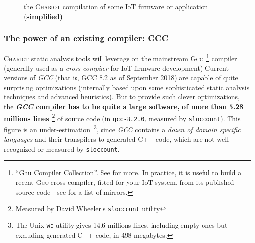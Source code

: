\begin{figure}[h]
  \begin{center}
  \end{center}
  \caption{the \textsc{Chariot} compilation of some IoT firmware or
    application {\textbf{(simplified)}}}
  \label{fig:chariotcompil}
\end{figure}


\subsubsection{The power of an existing compiler: GCC}

\textsc{Chariot} static analysis tools will leverage on the mainstream
\textsc{Gcc}~\footnote{``Gnu Compiler Collection''. See
   for more. In practice, it is useful to
  build a recent \textsc{Gcc} cross-compiler, fitted for your IoT
  system, from its published source code - see
   for a list of mirrors.}
compiler (generally used as a
\emph{cross-compiler} for IoT
firmware development) Current versions of \emph{GCC} (that is, GCC 8.2
as of September 2018) are capable of quite surprising optimizations
(internally based upon some sophisticated static analysis techniques
and advanced heuristics). But to provide such clever optimizations,
the \textbf{\emph{GCC} compiler has to be quite a large software, of
  more than 5.28 millions lines}~\footnote{Measured by
  \href{https://dwheeler.com/sloccount/}{David Wheeler's
    \texttt{sloccount}} utility} of source code (in
\texttt{gcc-8.2.0}, measured by \texttt{sloccount}). This figure is an
under-estimation~\footnote{The Unix \texttt{wc} utility gives 14.6
  millions lines, including empty ones but excluding generated C++
  code, in 498 megabytes.}, since \emph{GCC} contains a \emph{dozen of
  domain specific languages} and their transpilers to generated C++
code, which are not well recognized or measured by \texttt{sloccount}.


\medskip

